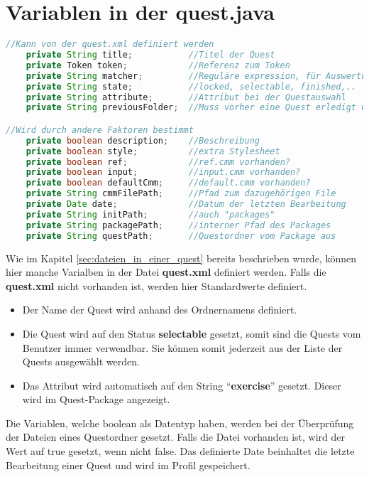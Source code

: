 \newpage
\section{Variablen in der quest.java}
\begin{lstlisting}[language=JAVA]
//Kann von der quest.xml definiert werden
	private String title;			//Titel der Quest		
	private Token token;			//Referenz zum Token
	private String matcher;			//Reguläre expression, für Auswertung benötigt
	private String state;			//locked, selectable, finished,..
	private String attribute;		//Attribut bei der Questauswahl
	private String previousFolder;	//Muss vorher eine Quest erledigt werden

//Wird durch andere Faktoren bestimmt
	private boolean description;	//Beschreibung
	private boolean style;			//extra Stylesheet
	private boolean ref;			//ref.cmm vorhanden?
	private boolean input;			//input.cmm vorhanden?	
	private boolean defaultCmm;		//default.cmm vorhanden?
	private String cmmFilePath;		//Pfad zum dazugehörigen File	
	private Date date;				//Datum der letzten Bearbeitung
	private String initPath;		//auch "packages"
	private String packagePath;		//interner Pfad des Packages
	private String questPath;		//Questordner vom Package aus

\end{lstlisting}
Wie im Kapitel \ref{sec:dateien_in_einer_quest} bereits beschrieben wurde, können hier manche Varialben in der Datei \textbf{quest.xml} definiert werden. Falls die \textbf{quest.xml} nicht vorhanden ist, werden hier Standardwerte definiert.

\begin{itemize}
\item Der Name der Quest wird anhand des Ordnernamens definiert.
\item Die Quest wird auf den Status \textbf{selectable} gesetzt, somit sind die Quests vom Benutzer immer verwendbar. Sie können somit jederzeit aus der Liste der Quests ausgewählt werden.
\item Das Attribut wird automatisch auf den String "`\textbf{exercise}"' gesetzt. Dieser wird im Quest-Package angezeigt.
\end{itemize}

Die Variablen, welche boolean als Datentyp haben, werden bei der Überprüfung der Dateien eines Questordner gesetzt. Falls die Datei vorhanden ist, wird der Wert auf true gesetzt, wenn nicht false. Das definierte Date beinhaltet die letzte Bearbeitung einer Quest und wird im Profil gespeichert.

